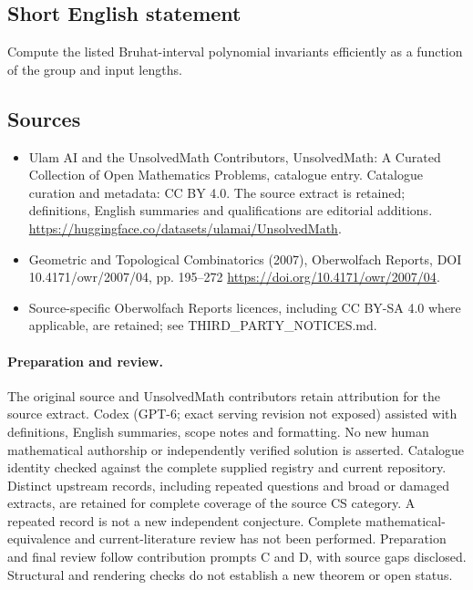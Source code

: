 \documentclass[11pt]{article}
\begin{document}
\subsection{Short English statement}
Compute the listed Bruhat-interval polynomial invariants efficiently as a function of the group and input lengths.
\subsection{Sources}
\begin{itemize}
\item[\hypertarget{source:statement:1}{S1}] Ulam AI and the UnsolvedMath Contributors, UnsolvedMath: A Curated Collection of Open Mathematics Problems, catalogue entry. Catalogue curation and metadata: CC BY 4.0. The source extract is retained; definitions, English summaries and qualifications are editorial additions.
\url{https://huggingface.co/datasets/ulamai/UnsolvedMath}.
\item[\hypertarget{source:statement:2}{S2}] Geometric and Topological Combinatorics (2007), Oberwolfach Reports, DOI 10.4171/owr/2007/04, pp. 195--272
\url{https://doi.org/10.4171/owr/2007/04}.
\item Source-specific Oberwolfach Reports licences, including CC BY-SA 4.0 where applicable, are retained; see THIRD\_PARTY\_NOTICES.md.
\end{itemize}
\paragraph{Preparation and review.}
The original source and UnsolvedMath contributors retain attribution for the source extract. Codex (GPT-6; exact serving revision not exposed) assisted with definitions, English summaries, scope notes and formatting. No new human mathematical authorship or independently verified solution is asserted. Catalogue identity checked against the complete supplied registry and current repository. Distinct upstream records, including repeated questions and broad or damaged extracts, are retained for complete coverage of the source CS category. A repeated record is not a new independent conjecture. Complete mathematical-equivalence and current-literature review has not been performed. Preparation and final review follow contribution prompts C and D, with source gaps disclosed. Structural and rendering checks do not establish a new theorem or open status.
\label{end:statement}
\end{document}
